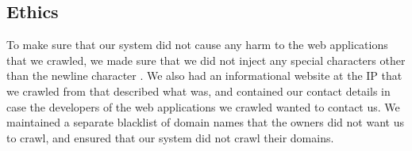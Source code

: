 \subsection{Ethics}
\vspace{-1ex}
To make sure that our system did not cause any harm to the web applications that we crawled, we made sure that we did not inject any special characters other than the newline character%
. We also had an informational website at the IP that we crawled from that described what \ehi was, and contained our contact details in case the developers of the web applications we crawled wanted to contact us. We maintained a separate blacklist of domain names that the owners did not want us to crawl, and ensured that our system did not crawl their domains.
